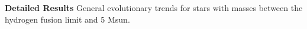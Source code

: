 \textbf{Detailed Results} 
General evolutionary trends for stars with masses between the hydrogen fusion limit and 5 Msun.